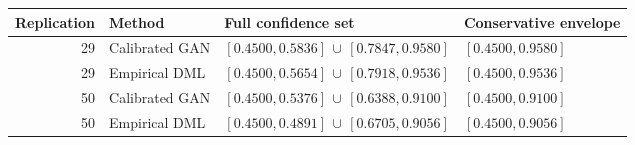 {\small
\setlength{\tabcolsep}{3pt}
\begin{tabular}{rlll}
\toprule
Replication & Method & Full confidence set & Conservative envelope \\
\midrule
29 & Calibrated GAN & $[0.4500,0.5836]\,\cup\,[0.7847,0.9580]$ & $[0.4500,0.9580]$ \\
29 & Empirical DML & $[0.4500,0.5654]\,\cup\,[0.7918,0.9536]$ & $[0.4500,0.9536]$ \\
50 & Calibrated GAN & $[0.4500,0.5376]\,\cup\,[0.6388,0.9100]$ & $[0.4500,0.9100]$ \\
50 & Empirical DML & $[0.4500,0.4891]\,\cup\,[0.6705,0.9056]$ & $[0.4500,0.9056]$ \\
\bottomrule
\end{tabular}
}
